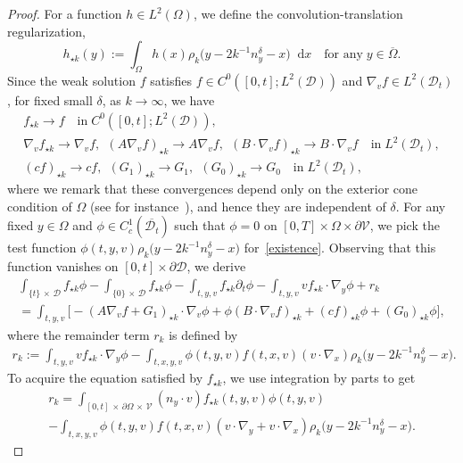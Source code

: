 \documentclass[10pt]{amsart}
\theoremstyle{definition}\newtheorem{defi}[theo]{Definition}\newtheorem{rema}[theo]{Remark}\newtheorem{exam}[theo]{Example}\newtheorem{exem}[theo]{Example}\newtheorem{nota}[theo]{Notation}
\newcommand*{\dif}{\mathop{}\!\mathrm{d}}
\newcommand*\p{\partial}
\newcommand*\V {\mathcal{V}}
\newcommand*\D {\mathcal{D}}
\begin{document}
\begin{proof}
For a function $h\in L^2(\Omega)$, we define the convolution-translation regularization,
\begin{equation}\label{convolution}
h_{\star k}(y):=\int_{\Omega}h(x) \rho_k\big(y-2k^{-1} n_y^\delta-x\big)\dif x \quad\text{for any}\;y\in\overline{\Omega}.
\end{equation}
Since the weak solution $f$ satisfies $f\in C^0([0,t];L^2(\D))$ and $\nabla_vf\in L^2(\D_t)$, for fixed small $\delta$, as $k\rightarrow\infty$, we have
\begin{multline}\label{gtf}
f_{\star k}\rightarrow f \quad\text{in}\; C^0\left([0,t];L^2(\D)\right),
\\
\nabla_vf_{\star k}\rightarrow \nabla_vf,\ \ (A\nabla_vf)_{\star k}\rightarrow A\nabla_vf,\ \ (B\cdot\nabla_vf)_{\star k}\rightarrow B\cdot\nabla_vf \quad\text{in}\; L^2(\D_t),\\
(cf)_{\star k}\rightarrow cf,\ \ (G_1)_{\star k}\rightarrow G_1,\ \ (G_0)_{\star k}\rightarrow G_0 \quad\text{in}\;L^2(\D_t), 
\end{multline}
where we remark that these convergences depend only on the exterior cone condition of $\Omega$ (see for instance~\cite[Theorem~2.4]{BLD}), and hence they are independent of $\delta$. For any fixed $y\in\Omega$ and $\phi\in C_c^1(\overline{\D_t})$ such that $\phi=0$ on $[0,T]\times\Omega\times\p\V$, we pick the test function $\phi(t,y,v)\rho_k\big(y-2k^{-1} n_y^\delta-x\big)$ for~\eqref{existence}. Observing that this function vanishes on $[0,t]\times\p\D$, we derive
\begin{multline}\label{rk0}
\int_{\{t\}\,\times\,\D}f_{\star k}\phi-\int_{\{0\}\,\times\,\D}f_{\star k}\phi -\int_{t,y,v}f_{\star k}\p_t\phi -\int_{t,y,v}vf_{\star k}\cdot\nabla_y\phi + r_k \\
= \int_{t,y,v}\big[-(A\nabla_vf+G_1)_{\star k}\cdot\nabla_v\phi +\phi(B\cdot\nabla_vf)_{\star k} + (cf)_{\star k}\phi + (G_0)_{\star k}\phi\big],
\end{multline}
where the remainder term $r_k$ is defined by
\begin{align*}
r_k:= \int_{t,y,v}vf_{\star k}\cdot\nabla_y\phi -\int_{t,x,y,v} \phi(t,y,v) f(t,x,v)(v\cdot\nabla_x)\rho_k\big(y-2k^{-1}n_y^\delta-x\big).
\end{align*}
To acquire the equation satisfied by $f_{\star k}$, we use integration by parts to get
\begin{multline*}
r_k=\int_{[0,t]\,\times\,\p\Omega\,\times\,\V} (n_y\cdot v) f_{\star k}(t,y,v) \phi(t,y,v)\\
-\int_{t,x,y,v} \phi(t,y,v)f(t,x,v) (v\cdot\nabla_y+v\cdot\nabla_x) \rho_k\big(y-2k^{-1}n_y^\delta-x\big).

\end{multline*}
\end{proof}
\end{document}
